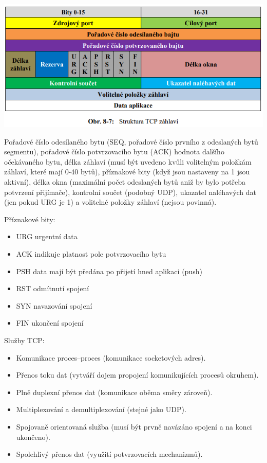 \begin{center}
\includegraphics[scale = 0.5]{images/-051.png}
\end{center}

Pořadové číslo odesílaného bytu (SEQ, pořadové číslo prvního z odeslaných bytů segmentu), pořadové číslo potvrzovacího bytu (ACK) hodnota dalšího očekávaného bytu, délka záhlaví (musí být uvedeno kvůli volitelným položkám záhlaví, které mají 0-40 bytů), příznakové bity (když jsou nastaveny na 1 jsou aktivní), délka okna (maximální počet odeslaných bytů aniž by bylo potřeba potvrzení přijímače), kontrolní součet (podobný UDP), ukazatel naléhavých dat (jen pokud URG je 1) a volitelné položky záhlaví (nejsou povinná).

Příznakové bity:
\begin{itemize}[noitemsep]
    \item URG urgentní data
    \item ACK indikuje platnost pole potvrzovacího bytu
    \item PSH data mají být předána po přijetí hned aplikaci (push)
    \item RST odmítnutí spojení
    \item SYN navazování spojení
    \item FIN ukončení spojení
\end{itemize}

Služby TCP:
\begin{itemize}[noitemsep]
    \item Komunikace proces--proces (komunikace socketových adres).
    \item Přenos toku dat (vytváří dojem propojení komunikujících procesů okruhem).
    \item Plně duplexní přenos dat (komunikace oběma směry zároveň).
    \item Multiplexování a demultiplexování (stejné jako UDP).
    \item Spojovaně orientovaná služba (musí být prvně navázáno spojení a na konci ukončeno).
    \item Spolehlivý přenos dat (využití potvrzovacích mechanizmů).
\end{itemize}

